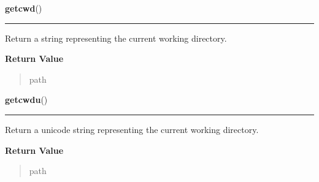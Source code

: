     \label{os:getcwd}

    \vspace{0.5ex}

\hspace{.8\funcindent}\begin{boxedminipage}{\funcwidth}

    \raggedright \textbf{getcwd}()

    \vspace{-1.5ex}

    \rule{\textwidth}{0.5\fboxrule}
\setlength{\parskip}{2ex}
    Return a string representing the current working directory.

\setlength{\parskip}{1ex}
      \textbf{Return Value}
    \vspace{-1ex}

      \begin{quote}
      path

      \end{quote}

    \end{boxedminipage}

    \label{os:getcwdu}

    \vspace{0.5ex}

\hspace{.8\funcindent}\begin{boxedminipage}{\funcwidth}

    \raggedright \textbf{getcwdu}()

    \vspace{-1.5ex}

    \rule{\textwidth}{0.5\fboxrule}
\setlength{\parskip}{2ex}
    Return a unicode string representing the current working directory.

\setlength{\parskip}{1ex}
      \textbf{Return Value}
    \vspace{-1ex}

      \begin{quote}
      path

      \end{quote}

    \end{boxedminipage}

    \label{os:getegid}

    \vspace{0.5ex}


